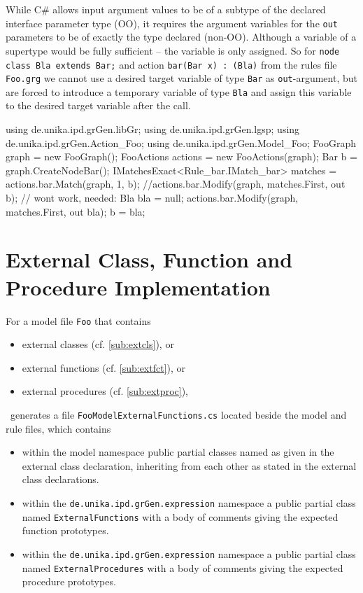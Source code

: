 \begin{warning}
While C\# allows input argument values to be of a subtype of the declared interface parameter type (OO), 
it requires the argument variables for the \texttt{out} parameters to be of exactly the type declared (non-OO).
Although a variable of a supertype would be fully sufficient -- the variable is only assigned.
So for \texttt{node class Bla extends Bar;} and action \texttt{bar(Bar x) : (Bla)} from the rules file \texttt{Foo.grg}
we cannot use a desired target variable of type \texttt{Bar} as \texttt{out}-argument,
but are forced to introduce a temporary variable of type \texttt{Bla}
and assign this variable to the desired target variable after the call.
\begin{csharplet}
using de.unika.ipd.grGen.libGr;
using de.unika.ipd.grGen.lgsp;
using de.unika.ipd.grGen.Action_Foo;
using de.unika.ipd.grGen.Model_Foo;
FooGraph graph = new FooGraph();
FooActions actions = new FooActions(graph);
Bar b = graph.CreateNodeBar();
IMatchesExact<Rule_bar.IMatch_bar> matches = actions.bar.Match(graph, 1, b);
//actions.bar.Modify(graph, matches.First, out b); // wont work, needed:
Bla bla = null; 
actions.bar.Modify(graph, matches.First, out bla);
b = bla;
\end{csharplet}
\end{warning}

\pagebreak

\section{External Class, Function and Procedure Implementation}\label{sub:extclsfctimpl}

For a model file \texttt{Foo} that contains 
\begin{itemize}
	\item external classes (cf. \ref{sub:extcls}), or
	\item external functions (cf. \ref{sub:extfct}), or 
	\item external procedures (cf. \ref{sub:extproc}), 
\end{itemize}
\GrG~generates a file \texttt{FooModelExternalFunctions.cs} located beside the model and rule files, which contains
\begin{itemize}
	\item within the model namespace public partial classes named as given in the external class declaration,
inheriting from each other as stated in the external class declarations.
	\item within the \texttt{de.unika.ipd.grGen.expression} namespace a public partial class named \texttt{ExternalFunctions} with a body of comments giving the expected function prototypes.
	\item within the \texttt{de.unika.ipd.grGen.expression} namespace a public partial class named \texttt{ExternalProcedures} with a body of comments giving the expected procedure prototypes.
\end{itemize}

